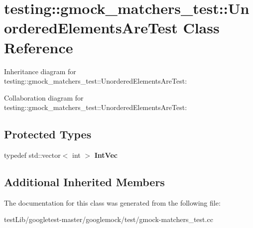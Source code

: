 \hypertarget{classtesting_1_1gmock__matchers__test_1_1UnorderedElementsAreTest}{}\section{testing\+:\+:gmock\+\_\+matchers\+\_\+test\+:\+:Unordered\+Elements\+Are\+Test Class Reference}
\label{classtesting_1_1gmock__matchers__test_1_1UnorderedElementsAreTest}


Inheritance diagram for testing\+:\+:gmock\+\_\+matchers\+\_\+test\+:\+:Unordered\+Elements\+Are\+Test\+:


Collaboration diagram for testing\+:\+:gmock\+\_\+matchers\+\_\+test\+:\+:Unordered\+Elements\+Are\+Test\+:
\subsection*{Protected Types}
\begin{DoxyCompactItemize}
\item 
\mbox{\label{classtesting_1_1gmock__matchers__test_1_1UnorderedElementsAreTest_a608750c71652943bd11fe7bb5281588d}} 
typedef std\+::vector$<$ int $>$ {\bfseries Int\+Vec}
\end{DoxyCompactItemize}
\subsection*{Additional Inherited Members}


The documentation for this class was generated from the following file\+:\begin{DoxyCompactItemize}
\item 
test\+Lib/googletest-\/master/googlemock/test/gmock-\/matchers\+\_\+test.\+cc\end{DoxyCompactItemize}
